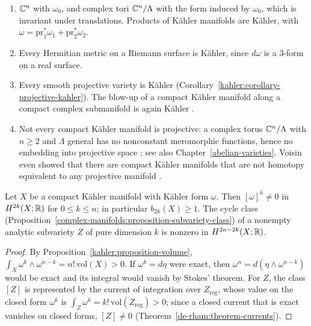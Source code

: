 \begin{example}\label{kahler:example-kahler}
\begin{enumerate}
\item $\mathbb{C}^n$ with $\omega_0$, and complex tori $\mathbb{C}^n/\Lambda$ with the form induced by $\omega_0$, which is invariant under translations. Products
of K\"ahler manifolds are K\"ahler, with $\omega = \mathrm{pr}_1^*\omega_1 + \mathrm{pr}_2^*\omega_2$.
\item Every Hermitian metric on a Riemann surface is K\"ahler, since $d\omega$ is a $3$-form on a real surface.
\item Every smooth projective variety is K\"ahler (Corollary~\ref{kahler:corollary-projective-kahler}). The blow-up of a compact K\"ahler
manifold along a compact complex submanifold is again K\"ahler \cite[Chapter 3]{voisin-hodge-1}.
\item Not every compact K\"ahler manifold is projective: a complex torus $\mathbb{C}^n/\Lambda$ with $n \geq 2$ and $\Lambda$ general has no
nonconstant meromorphic functions, hence no embedding into projective space \cite{birkenhake-lange}; see also Chapter~\ref{abelian-varieties}. Voisin even showed that there
are compact K\"ahler manifolds that are not homotopy equivalent to any projective manifold \cite{voisin-kodaira}.
\end{enumerate}
\end{example}

\begin{proposition}\label{kahler:proposition-kahler-class-powers}
Let $X$ be a compact K\"ahler manifold with K\"ahler form $\omega$. Then $[\omega]^k \neq 0$ in $H^{2k}(X; \mathbb{R})$ for $0 \leq k \leq n$; in
particular $b_{2k}(X) \geq 1$. The cycle class (Proposition~\ref{complex-manifolds:proposition-subvariety-class}) of a nonempty analytic
subvariety $Z$ of pure dimension $k$ is nonzero in $H^{2n-2k}(X; \mathbb{R})$.
\end{proposition}

\begin{proof}
By Proposition~\ref{kahler:proposition-volume}, $\int_X\omega^k \wedge \omega^{n-k} = n!\,\mathrm{vol}(X) > 0$. If $\omega^k = d\eta$ were
exact, then $\omega^n = d(\eta \wedge \omega^{n-k})$ would be exact and its integral would vanish by Stokes' theorem. For $Z$, the class
$[Z]$ is represented by the current of integration over $Z_{\mathrm{reg}}$, whose value on the closed form $\omega^k$ is
$\int_Z\omega^k = k!\,\mathrm{vol}(Z_{\mathrm{reg}}) > 0$; since a closed current that is exact vanishes on closed forms, $[Z] \neq 0$
(Theorem~\ref{de-rham:theorem-currents}).
\end{proof}

